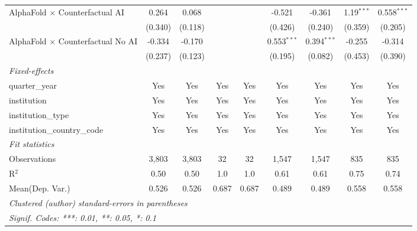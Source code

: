 \begin{tabular}{lcccccccc}
   AlphaFold $\times$ Counterfactual AI     & 0.264       & 0.068         &                &     & -0.521        & -0.361        & 1.19$^{***}$ & 0.558$^{***}$\\   
                                            & (0.340)     & (0.118)       &                &     & (0.426)       & (0.240)       & (0.359)      & (0.205)\\   
   AlphaFold $\times$ Counterfactual No AI  & -0.334      & -0.170        &                &     & 0.553$^{***}$ & 0.394$^{***}$ & -0.255       & -0.314\\   
                                            & (0.237)     & (0.123)       &                &     & (0.195)       & (0.082)       & (0.453)      & (0.390)\\   
   \midrule
   \emph{Fixed-effects}\\
   quarter\_year                            & Yes         & Yes           & Yes            & Yes & Yes           & Yes           & Yes          & Yes\\  
   institution                              & Yes         & Yes           & Yes            & Yes & Yes           & Yes           & Yes          & Yes\\  
   institution\_type                        & Yes         & Yes           & Yes            & Yes & Yes           & Yes           & Yes          & Yes\\  
   institution\_country\_code               & Yes         & Yes           & Yes            & Yes & Yes           & Yes           & Yes          & Yes\\  
   \midrule
   \emph{Fit statistics}\\
   Observations                             & 3,803       & 3,803         & 32             & 32  & 1,547         & 1,547         & 835          & 835\\  
   R$^2$                                    & 0.50        & 0.50          & 1.0            & 1.0 & 0.61          & 0.61          & 0.75         & 0.74\\  
Mean(Dep. Var.) & 0.526 & 0.526 & 0.687 & 0.687 & 0.489 & 0.489 & 0.558 & 0.558 \\
   \midrule \midrule
   \multicolumn{9}{l}{\emph{Clustered (author) standard-errors in parentheses}}\\
   \multicolumn{9}{l}{\emph{Signif. Codes: ***: 0.01, **: 0.05, *: 0.1}}\\
\end{tabular}
\par\endgroup
